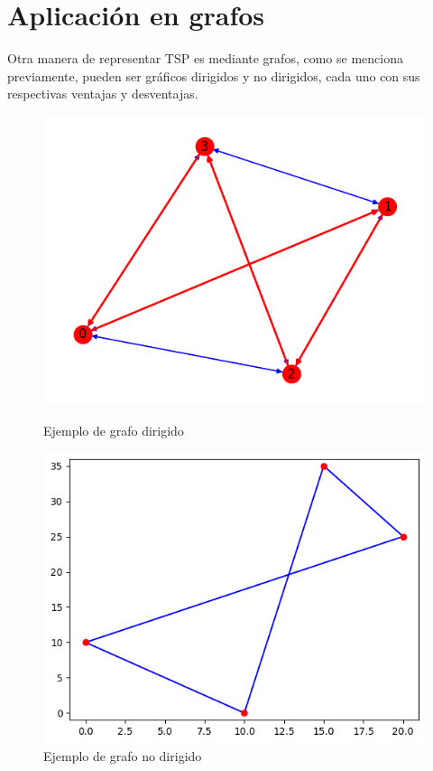         \section{Aplicación en grafos}
            Otra manera de representar TSP es mediante grafos, como se menciona previamente, pueden ser gráficos dirigidos y no dirigidos, cada uno con sus respectivas ventajas y desventajas.
                \newline
                \begin{figure}[ht]
                    \centering
                    \begin{minipage}{0.45\textwidth}
                        \centering
                        \includegraphics[scale=0.4]{imgs/Grafo_Dirigido.png}
                        \caption{Ejemplo de grafo dirigido}
                        \label{Ilustracion 5}
                    \end{minipage}\hfill
                    \begin{minipage}{0.45\textwidth}
                        \centering
                        \includegraphics[scale=0.4]{imgs/Grafo_No_Dirigido.png}
                        \caption{Ejemplo de grafo no dirigido}
                        \label{Ilustracion 4}
                    \end{minipage}
                \end{figure}

